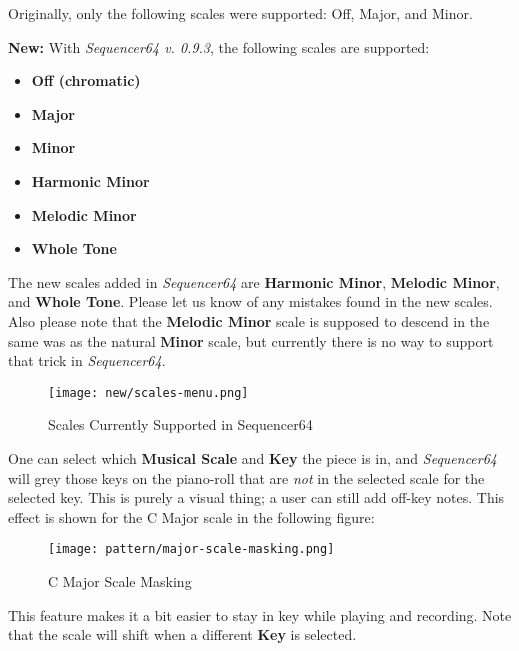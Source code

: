   Originally, only the following scales were supported: Off, Major, and Minor.

   \textbf{New:}
   With \textsl{Sequencer64 v. 0.9.3}, the following scales are supported:

   \begin{itemize}
      \item \textbf{Off (chromatic)}
      \item \textbf{Major}
      \item \textbf{Minor}
      \item \textbf{Harmonic Minor}
      \item \textbf{Melodic Minor}
      \item \textbf{Whole Tone}
   \end{itemize}

   The new scales added in \textsl{Sequencer64} are
   \textbf{Harmonic Minor}, \textbf{Melodic Minor}, and \textbf{Whole Tone}.
   Please let us know of any mistakes found in the new scales.
   Also please note that the \textbf{Melodic Minor} scale is supposed to
   descend in the same was as the natural \textbf{Minor} scale, but
   currently there is no way to support that trick in
   \textsl{Sequencer64}.

\begin{figure}[H]
   \centering 
   \texttt{[image: new/scales-menu.png]}
   \caption{Scales Currently Supported in Sequencer64}
   \label{fig:pattern_editor_available_scales}
\end{figure}

   One can select which \textbf{Musical Scale} and
   \textbf{Key} the piece is in,
   and \textsl{Sequencer64} will grey those keys on the piano-roll that
   are \textsl{not} in the selected scale for the selected key.
   This is purely a visual thing; a user can still add off-key notes.
   This effect is shown for the C Major scale in the following figure:

\begin{figure}[H]
   \centering 
   \texttt{[image: pattern/major-scale-masking.png]}
   \caption{C Major Scale Masking}
   \label{fig:pattern_editor_major_scale_masking}
\end{figure}

   This feature makes it a bit easier to stay in key while playing and
   recording.  Note that the scale will shift when a different
   \textbf{Key} is selected.

